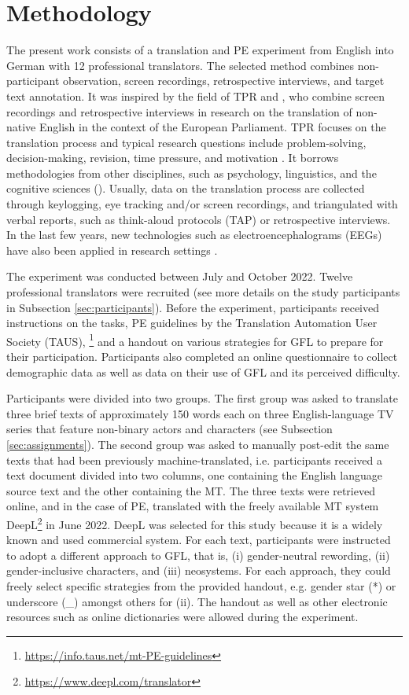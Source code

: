 \chapter{Methodology}
\label{methodology}

The present work consists of a translation and PE experiment from English into German with 12 professional translators. The selected method combines non-participant observation, screen recordings, retrospective interviews, and target text annotation. It was inspired by the field of TPR and \textcite{albl2017professional}, who combine screen recordings and retrospective interviews in research on the translation of non-native English in the context of the European Parliament. TPR focuses on the translation process and typical research questions include problem-solving, decision-making, revision, time pressure, and motivation \citep[123f]{jaaskelainen2011studying}. It borrows methodologies from other disciplines, such as psychology, linguistics, and the cognitive sciences (\cite[18]{alves2015translation}). Usually, data on the translation process are collected through keylogging, eye tracking and/or screen recordings, and triangulated with verbal reports, such as think-aloud protocols (TAP) or retrospective interviews. In the last few years, new technologies such as electroencephalograms (EEGs) have also been applied in research settings \citep[21]{jakobsen2017translation}.

The experiment was conducted between July and October 2022. Twelve professional translators were recruited (see more details on the study participants in Subsection \ref{sec:participants}). Before the experiment, participants received instructions on the tasks, PE guidelines by the Translation Automation User Society (TAUS), \footnote{\url{https://info.taus.net/mt-PE-guidelines}} and a handout on various strategies for GFL to prepare for their participation. Participants also completed an online questionnaire to collect demographic data as well as data on their use of GFL and its perceived difficulty.

Participants were divided into two groups. The first group was asked to translate three brief texts of approximately 150 words each on three English-language TV series that feature non-binary actors and characters (see Subsection \ref{sec:assignments}). The second group was asked to manually post-edit the same texts that had been previously machine-translated, i.e. participants received a text document divided into two columns, one containing the English language source text and the other containing the MT. The three texts were retrieved online, and in the case of PE, translated with the freely available MT system DeepL\footnote{\url{https://www.deepl.com/translator}} in June 2022. DeepL was selected for this study because it is a widely known and used commercial system. For each text, participants were instructed to adopt a different approach to GFL, that is, (i) gender-neutral rewording, (ii) gender-inclusive characters, and  (iii) neosystems. For each approach, they could freely select specific strategies from the provided handout, e.g. gender star (*) or underscore (\_) amongst others for (ii). The handout as well as other electronic resources such as online dictionaries were allowed during the experiment. 

